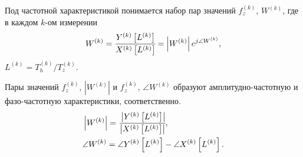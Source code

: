 Под частотной характеристикой понимается набор пар значений ${f^{(k)}_{z}}$, ${W^{(k)}}$, где в каждом $k$-ом измерении
\begin{equation}\label{eqn:complexFreqResp}
    W^{(k)} = \cfrac{Y^{(k)}\left[L^{(k)}\right]}{X^{(k)}\left[L^{(k)}\right]} = \left| W^{(k)} \right| e^{j \angle W^{(k)}},
\end{equation}
${L^{(k)} = {T^{(k)}_{h}} / {T^{(k)}_{z}}}$.

Пары значений ${f^{(k)}_{z}}$, ${\left| W^{(k)} \right|}$ и ${f^{(k)}_{z}}$, ${\angle W^{(k)}}$ образуют амплитудно-частотную и фазо-частотную характеристики, соответственно.
\begin{equation}\label{eqn:abs_angleFreqResp}
    \begin{aligned}
        &\left| W^{(k)} \right| = \cfrac{\left| Y^{(k)}\left[L^{(k)}\right] \right| }{ \left| X^{(k)}\left[L^{(k)}\right] \right|}, \\
        &\angle W^{(k)} = \angle Y^{(k)}\left[L^{(k)}\right] - \angle X^{(k)}\left[L^{(k)}\right].
    \end{aligned}
\end{equation}